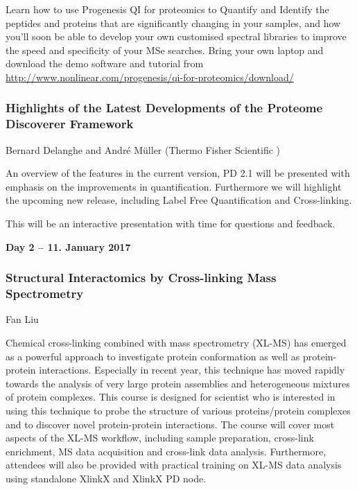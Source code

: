Learn how to use Progenesis QI for proteomics to Quantify and Identify the
peptides and proteins that are significantly changing in your samples, and how
you'll soon be able to develop your own customised spectral libraries to improve
the speed and specificity of your MSe searches. Bring your own laptop and
download the demo software and tutorial from
\url{http://www.nonlinear.com/progenesis/qi-for-proteomics/download/}


\subsubsection*{\color{eubicRed} Highlights of the Latest Developments of the Proteome Discoverer Framework}
{\color{eubicGray} Bernard Delanghe and Andr\'e M\"uller (Thermo Fisher Scientific )}

An overview of the features in the current version, PD 2.1 will be presented
with emphasis on the improvements in quantification. Furthermore we will
highlight the upcoming  new release, including Label Free Quantification and
Cross-linking.

This will be an interactive presentation with time for questions and feedback.


\noindent\textbf{Day 2 -- 11. January 2017}

\subsubsection*{\color{eubicRed} Structural Interactomics by Cross-linking Mass Spectrometry}
{\color{eubicGray} Fan Liu}

Chemical cross-linking combined with mass spectrometry (XL-MS) has emerged as a
powerful approach to investigate protein conformation as well as protein-protein
interactions. Especially in recent year, this technique has moved rapidly
towards the analysis of very large protein assemblies and heterogeneous mixtures
of protein complexes. This course is designed for scientist who is interested in
using this technique to probe the structure of various proteins/protein
complexes and to discover novel protein-protein interactions. The course will
cover most aspects of the XL-MS workflow, including sample preparation,
cross-link enrichment, MS data acquisition and cross-link data analysis.
Furthermore, attendees will also be provided with practical training on XL-MS
data analysis using standalone XlinkX and XlinkX PD node.


